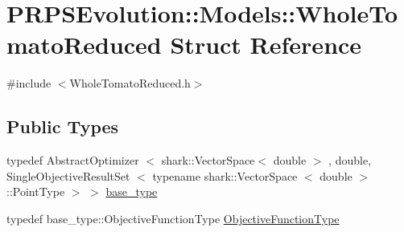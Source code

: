 \hypertarget{struct_p_r_p_s_evolution_1_1_models_1_1_whole_tomato_reduced}{\section{\-P\-R\-P\-S\-Evolution\-:\-:\-Models\-:\-:\-Whole\-Tomato\-Reduced \-Struct \-Reference}
\label{struct_p_r_p_s_evolution_1_1_models_1_1_whole_tomato_reduced}
}


{\ttfamily \#include $<$\-Whole\-Tomato\-Reduced.\-h$>$}

\subsection*{\-Public \-Types}
\begin{DoxyCompactItemize}
\item 
typedef \-Abstract\-Optimizer\*
$<$ shark\-::\-Vector\-Space$<$ double $>$\*
, double, \*
\-Single\-Objective\-Result\-Set\*
$<$ typename shark\-::\-Vector\-Space\*
$<$ double $>$\-::\-Point\-Type $>$ $>$ \hyperlink{struct_p_r_p_s_evolution_1_1_models_1_1_whole_tomato_reduced_ac9bb500c21650189965b0ee3a4be7711}{base\-\_\-type}
\item 
typedef \*
base\-\_\-type\-::\-Objective\-Function\-Type \hyperlink{struct_p_r_p_s_evolution_1_1_models_1_1_whole_tomato_reduced_a3c630a87315f434a332b6a753576ce78}{\-Objective\-Function\-Type}
\end{DoxyCompactItemize}
